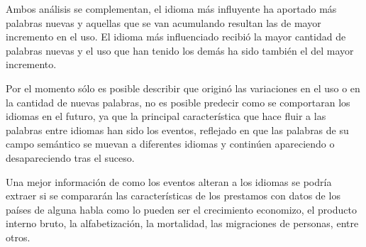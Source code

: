 Ambos análisis se complementan,  el idioma más influyente ha aportado más palabras nuevas y aquellas que se van acumulando resultan las de mayor incremento en el uso. El idioma más influenciado recibió la mayor cantidad de palabras nuevas y el uso que han tenido los demás ha sido también el del mayor incremento. 

Por el momento sólo es posible describir que originó las variaciones en el uso o en la cantidad de nuevas palabras, no es posible predecir como se comportaran los idiomas en el futuro, ya que la principal característica que  hace fluir a las palabras entre idiomas han sido los eventos, reflejado en que las palabras de su campo semántico  se muevan a diferentes idiomas y continúen apareciendo o desapareciendo tras el suceso. 

Una mejor información de como los eventos alteran a los idiomas se podría extraer si se compararán las características de los prestamos con  datos de los países de alguna habla como lo pueden ser  el crecimiento economizo, el producto interno bruto, la alfabetización, la mortalidad, las migraciones de personas, entre otros.








